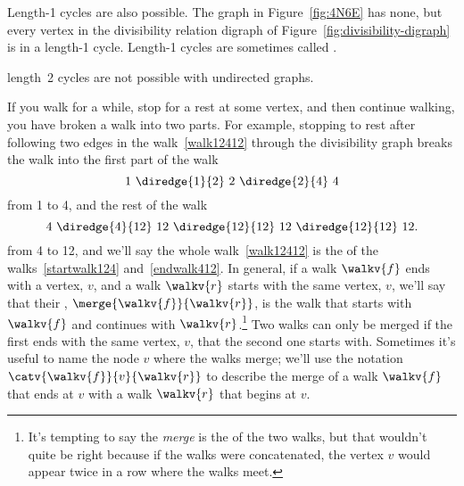 Length-1 cycles are also possible.  The graph in Figure~\ref{fig:4N6E}
has none, but every vertex in the divisibility relation digraph of
Figure~\ref{fig:divisibility-digraph} is in a length-1 cycle.
Length-1 cycles are sometimes called .

\begin{editingnotes}
length~2 cycles are not possible with undirected graphs.
\end{editingnotes}

If you walk for a while, stop for a rest at some vertex, and then
continue walking, you have broken a walk into two parts.  For example,
stopping to rest after following two edges in the walk~\eqref{walk12412}
through the divisibility graph breaks the walk into the first part of the walk
\begin{equation}\label{startwalk124}
1\ \diredge{1}{2}\  2\  \diredge{2}{4}\  4
\end{equation}
from 1 to 4, and the rest of the walk
\begin{equation}\label{endwalk412}
4\ \diredge{4}{12}\  12\  \diredge{12}{12}\  12\ \diredge{12}{12}\  12.
\end{equation}
from 4 to 12, and we'll say the whole walk~\eqref{walk12412} is the
 of the walks~\eqref{startwalk124} and~\eqref{endwalk412}.
In general, if a walk $\walkv{f}$ ends with a vertex, $v$, and a walk
$\walkv{r}$ starts with the same vertex, $v$, we'll say that their
, $\merge{\walkv{f}}{\walkv{r}}$, is the walk that starts
with $\walkv{f}$ and continues with $\walkv{r}$.\footnote{It's
  tempting to say the \emph{merge} is the  of the
  two walks, but that wouldn't quite be right because if the walks
  were concatenated, the vertex $v$ would appear twice in a row where
  the walks meet.}  Two walks can only be merged if the first ends
with the same vertex, $v$, that the second one starts with.  Sometimes
it's useful to name the node $v$ where the walks merge; we'll use the
notation $\catv{\walkv{f}}{v}{\walkv{r}}$ to describe the merge of a
walk $\walkv{f}$ that ends at $v$ with a walk $\walkv{r}$ that begins
at $v$.

\iffalse
 Here's a precise definition:
\begin{definition}
If a walk $\walkv{f}$ ends at a vertex $v$ and a walk $\walkv{r}$
begins at the same vertex $v$, then the \term{$v$-merge} of
$\walkv{f}$ with $\walkv{r}$, written,
\[
\catv{\walkv{f}}{v}{\walkv{r}},
\]
is the walk whose vertex sequence is the vertex sequence of
$\walkv{f}$ concatenated with the vertex sequence of $\walkv{r}$
without its initial $v$.  That is, if
\begin{align*}
\walkv{r} & = v\,\vec{\alpha},
\end{align*}
for some finite sequence $\vec{\alpha}$ of vertices,
then
\[
\catv{\walkv{f}}{v}{\walkv{r}} \eqdef  \walkv{f}\alpha.
\]
\end{definition}
\fi

